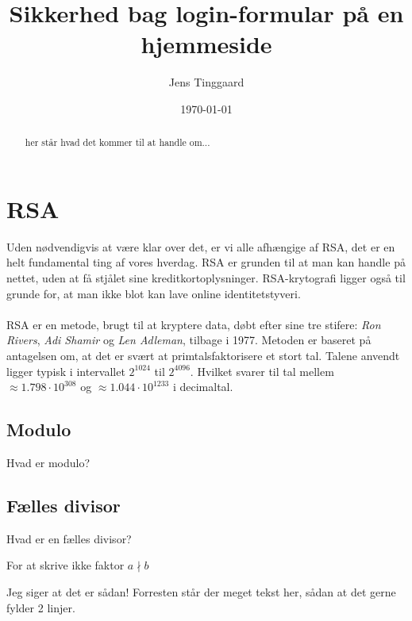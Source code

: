 \documentclass[a4paper, 12pt]{article}
\date{\today}
\title{Sikkerhed bag login-formular på en hjemmeside}
\author{Jens Tinggaard}
\begin{document}
\clearpage\maketitle
\thispagestyle{empty}
\maketitle

\begin{abstract}
her står hvad det kommer til at handle om...
\end{abstract}



\newpage
\tableofcontents


\newpage
\section{RSA}
Uden nødvendigvis at være klar over det, er vi alle afhængige af RSA, det er en helt fundamental ting af vores hverdag.
RSA er grunden til at man kan handle på nettet, uden at få stjålet sine kreditkortoplysninger.
RSA-krytografi ligger også til grunde for, at man ikke blot kan lave online identitetstyveri.\autocite{vestergaard}
\\
\\
RSA er en metode, brugt til at kryptere data, døbt efter sine tre stifere:
\textit{Ron Rivers}, \textit{Adi Shamir} og \textit{Len Adleman}, tilbage i 1977.\autocite{vestergaard}
Metoden er baseret på antagelsen om, at det er svært at primtalsfaktorisere et stort tal.
Talene anvendt ligger typisk i intervallet \(2^{1024}\) til \(2^{4096}\).
Hvilket svarer til tal mellem \(\approx1.798\cdot10^{308}\) og \(\approx1.044\cdot10^{1233}\) i decimaltal.\autocite{frividenpdfs21}

    \subsection{Modulo}
    Hvad er modulo?

    \subsection{Fælles divisor}
    Hvad er en fælles divisor?


    \begin{lemma}
        For at skrive ikke faktor \(a \nmid b\)
    \end{lemma}

    \begin{define}
        Jeg siger at det er sådan! Forresten står der meget tekst her, sådan at det gerne fylder 2 linjer.
    \end{define}
\end{document}
